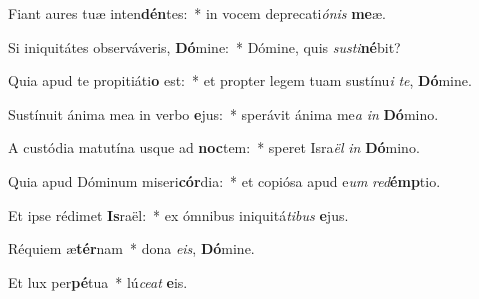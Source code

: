 \item Fiant aures tuæ inten\textbf{dén}tes:~* in vocem deprecati\textit{ó}\textit{nis} \textbf{me}æ.

\item Si iniquitátes observáveris, \textbf{Dó}mine:~* Dómine, quis \textit{sus}\textit{ti}\textbf{né}bit?

\item Quia apud te propitiáti\textbf{o} est:~* et propter legem tuam sustínu\textit{i} \textit{te}, \textbf{Dó}mine.

\item Sustínuit ánima mea in verbo \textbf{e}jus:~* sperávit ánima me\textit{a} \textit{in} \textbf{Dó}mino.

\item A custódia matutína usque ad \textbf{noc}tem:~* speret Isra\textit{ël} \textit{in} \textbf{Dó}mino.

\item Quia apud Dóminum miseri\textbf{cór}dia:~* et copiósa apud e\textit{um} \textit{red}\textbf{émp}tio.

\item Et ipse rédimet \textbf{Is}raël:~* ex ómnibus iniquitá\textit{ti}\textit{bus} \textbf{e}jus.

\item Réquiem æ\textbf{tér}nam~* dona \textit{e}\textit{is}, \textbf{Dó}mine.

\item Et lux per\textbf{pé}tua~* lú\textit{ce}\textit{at} \textbf{e}is.